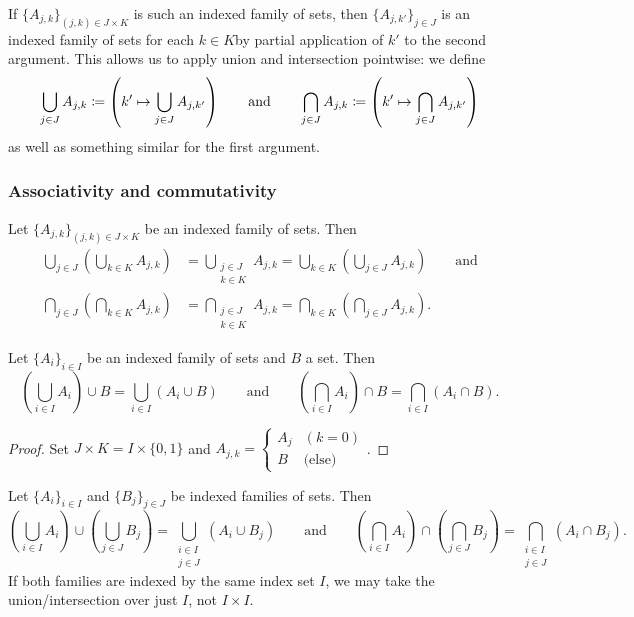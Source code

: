 If $\{A_{j,k}\}_{(j,k) \in J\times K}$ is such an indexed family of sets, then $\{A_{j,k'}\}_{j\in J}$ is an indexed family of sets for each $k\in K$by partial application of $k'$ to the second argument. This allows us to apply union and intersection pointwise: we define
\[ \bigcup_{j\in J}A_{j,k} \coloneqq \left(k'\mapsto \bigcup_{j\in J}A_{j,k'}\right) \qquad\text{and}\qquad \bigcap_{j\in J}A_{j,k} \coloneqq \left(k'\mapsto \bigcap_{j\in J}A_{j,k'}\right) \]
as well as something similar for the first argument.

\subsubsection{Associativity and commutativity}
\begin{lemma} \label{lemma:setAssociativityCommutativity}
Let $\{A_{j,k}\}_{(j,k) \in J\times K}$ be an indexed family of sets. Then
\begin{align*}
\bigcup_{j\in J}\left(\bigcup_{k\in K}A_{j,k}\right) &= \bigcup_{\substack{j\in J \\ k\in K}}A_{j,k} = \bigcup_{k\in K}\left(\bigcup_{j\in J}A_{j,k}\right) \qquad\text{and} \\
\bigcap_{j\in J}\left(\bigcap_{k\in K}A_{j,k}\right) &= \bigcap_{\substack{j\in J \\ k\in K}}A_{j,k} = \bigcap_{k\in K}\left(\bigcap_{j\in J}A_{j,k}\right).
\end{align*}
\end{lemma}
\begin{corollary}
Let $\{A_{i}\}_{i \in I}$ be an indexed family of sets and $B$ a set. Then
\[ \left(\bigcup_{i\in I}A_i\right)\cup B = \bigcup_{i\in I}(A_i\cup B) \qquad\text{and}\qquad \left(\bigcap_{i\in I}A_i\right)\cap B = \bigcap_{i\in I}(A_i\cap B). \]
\end{corollary}
\begin{proof}
Set $J\times K = I\times\{0,1\}$ and $A_{j,k} = \begin{cases}
A_j & (k=0) \\
B & \text{(else)}
\end{cases}$.
\end{proof}
\begin{corollary}
Let $\{A_{i}\}_{i \in I}$ and $\{B_{j}\}_{j \in J}$ be indexed families of sets. Then
\[ \left(\bigcup_{i\in I}A_i\right)\cup \left(\bigcup_{j\in J}B_j\right) = \bigcup_{\substack{i\in I\\j\in J}}(A_i\cup B_j) \qquad\text{and}\qquad \left(\bigcap_{i\in I}A_i\right)\cap \left(\bigcap_{j\in J}B_j\right) = \bigcap_{\substack{i\in I\\j\in J}}(A_i\cap B_j). \]
If both families are indexed by the same index set $I$, we may take the union/intersection over just $I$, not $I\times I$.
\end{corollary}

